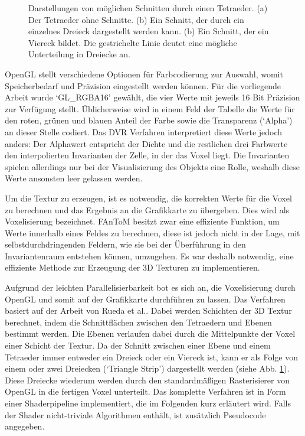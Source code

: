 \documentclass[a4paper,fontsize=12pt,toc=bib,halfparskip]{scrartcl}
\begin{document}
\begin{figure}
\begin{subfigure}{0.2\textwidth}
		\caption{}
	\end{subfigure}
	\hspace{0.5cm}
	\caption{Darstellungen von m\"oglichen Schnitten durch einen Tetraeder. (a) Der Tetraeder ohne Schnitte. (b) Ein Schnitt, der durch ein einzelnes Dreieck dargestellt werden kann. (b) Ein Schnitt, der ein Viereck bildet. Die gestrichelte Linie deutet eine m\"ogliche Unterteilung in Dreiecke an.}
	\label{TetraCuts}
\end{figure}

OpenGL stellt verschiedene Optionen f\"ur Farbcodierung zur Auswahl, womit Speicherbedarf und Pr\"azision eingestellt werden k\"onnen. F\"ur die vorliegende Arbeit wurde `GL\_RGBA16' gew\"ahlt, die vier Werte mit jeweils 16 Bit Pr\"azision zur Verf\"ugung stellt. \"Ublicherweise wird in einem Feld der Tabelle die Werte f\"ur den roten, gr\"unen und blauen Anteil der Farbe sowie die Transparenz (`Alpha') an dieser Stelle codiert. Das DVR Verfahren interpretiert diese Werte jedoch anders: Der Alphawert entspricht der Dichte und die restlichen drei Farbwerte den interpolierten Invarianten der Zelle, in der das Voxel liegt. Die Invarianten spielen allerdings nur bei der Visualisierung des Objekts eine Rolle, weshalb diese Werte ansonsten leer gelassen werden.

Um die Textur zu erzeugen, ist es notwendig, die korrekten Werte f\"ur die Voxel zu berechnen und das Ergebnis an die Grafikkarte zu \"ubergeben. Dies wird als Voxelisierung bezeichnet. FAnToM besitzt zwar eine effiziente Funktion, um Werte innerhalb eines Feldes zu berechnen, diese ist jedoch nicht in der Lage, mit selbstdurchdringenden Feldern, wie sie bei der \"Uberf\"uhrung in den Invariantenraum entstehen k\"onnen, umzugehen. Es war deshalb notwendig, eine effiziente Methode zur Erzeugung der 3D Texturen zu implementieren. 

Aufgrund der leichten Parallelisierbarkeit bot es sich an, die Voxelisierung durch OpenGL und somit auf der Grafikkarte durchf\"uhren zu lassen. Das Verfahren basiert auf der Arbeit von Rueda et al.\cite{rueda2004voxelization}. Dabei werden Schichten der 3D Textur berechnet, indem die Schnittfl\"achen zwischen den Tetraedern und Ebenen bestimmt werden. Die Ebenen verlaufen dabei durch die Mittelpunkte der Voxel einer Schicht der Textur. Da der Schnitt zwischen einer Ebene und einem Tetraeder immer entweder ein Dreieck oder ein Viereck ist, kann er als Folge von einem oder zwei Dreiecken (`Triangle Strip') dargestellt werden (siehe Abb. \ref{TetraCuts}). Diese Dreiecke wiederum werden durch den standardm\"a{\ss}igen Rasterisierer von OpenGL in die fertigen Voxel unterteilt. Das komplette Verfahren ist in Form einer Shaderpipeline implementiert, die im Folgenden kurz erl\"autert wird. Falls der Shader nicht-triviale Algorithmen enth\"alt, ist zus\"atzlich Pseudocode angegeben.
\end{document}
